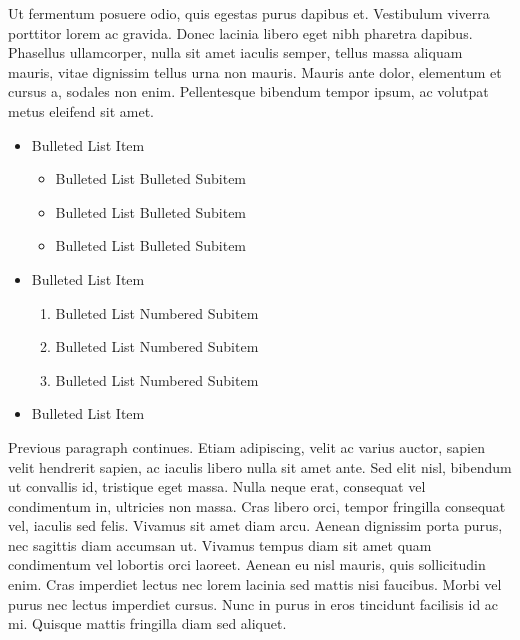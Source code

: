 Ut fermentum posuere odio, quis egestas purus dapibus et. Vestibulum viverra porttitor lorem ac gravida. Donec lacinia libero eget nibh pharetra dapibus. Phasellus ullamcorper, nulla sit amet iaculis semper, tellus massa aliquam mauris, vitae dignissim tellus urna non mauris. Mauris ante dolor, elementum et cursus a, sodales non enim. Pellentesque bibendum tempor ipsum, ac volutpat metus eleifend sit amet. 
\begin{itemize}
\item{Bulleted List Item}
\begin{itemize}
\item{Bulleted List Bulleted Subitem}
\item{Bulleted List Bulleted Subitem}
\item{Bulleted List Bulleted Subitem}
\end{itemize}
\item{Bulleted List Item}
\begin{enumerate}
\item{Bulleted List Numbered Subitem}
\item{Bulleted List Numbered Subitem}
\item{Bulleted List Numbered Subitem}
\end{enumerate}
\item{Bulleted List Item}
\end{itemize}
Previous paragraph continues. Etiam adipiscing, velit ac varius auctor, sapien velit hendrerit sapien, ac iaculis libero nulla sit amet ante. Sed elit nisl, bibendum ut convallis id, tristique eget massa. Nulla neque erat, consequat vel condimentum in, ultricies non massa. Cras libero orci, tempor fringilla consequat vel, iaculis sed felis. Vivamus sit amet diam arcu. Aenean dignissim porta purus, nec sagittis diam accumsan ut. Vivamus tempus diam sit amet quam condimentum vel lobortis orci laoreet. Aenean eu nisl mauris, quis sollicitudin enim. Cras imperdiet lectus nec lorem lacinia sed mattis nisi faucibus. Morbi vel purus nec lectus imperdiet cursus. Nunc in purus in eros tincidunt facilisis id ac mi. Quisque mattis fringilla diam sed aliquet. 
